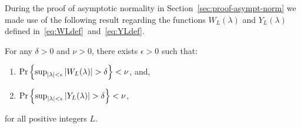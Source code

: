\documentclass[journal]{IEEEtran}
\begin{document}
During the proof of asymptotic normality in Section~\ref{sec:proof-asympt-norm} we made use of the following result regarding the functions $W_L(\lambda)$ and $Y_L(\lambda)$ defined in~\eqref{eq:WLdef}~and~\eqref{eq:YLdef}.

\begin{lemma}\label{lem:ZYLempiricproc}
For any $\delta > 0$ and $\nu > 0$, there exists $\epsilon > 0$ such that:
\begin{enumerate}
\item $\Pr\left\{ \sup_{{\vert \lambda \vert}<\epsilon}{\vert W_L(\lambda) \vert} > \delta  \right\} < \nu$, and,
\item $\Pr\left\{ \sup_{{\vert \lambda \vert}<\epsilon}{\vert Y_L(\lambda) \vert} > \delta  \right\} < \nu$,
\end{enumerate}
for all positive integers $L$.
\end{lemma}
\end{document}
